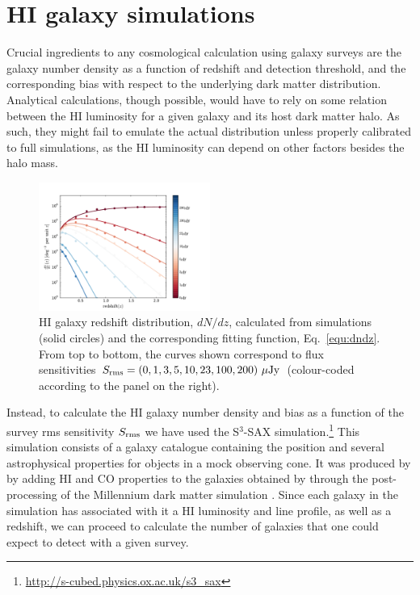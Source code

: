 \documentclass[useAMS,usenatbib]{mn2e}
\begin{document}
\section{HI galaxy simulations}

Crucial ingredients to any cosmological calculation using galaxy surveys are the galaxy number density as a function of redshift and detection threshold, and the corresponding bias with respect to the underlying dark matter distribution. Analytical calculations, though possible, would have to rely on some relation between the HI luminosity for a given galaxy and its host dark matter halo. As such, they might fail to emulate the actual distribution unless properly calibrated to full simulations, as the HI luminosity can depend on other factors besides the halo mass.
\begin{figure}
\begin{center}
\includegraphics[width=0.5\textwidth]{plots/fittingMario_dNOverdz_using_ObreschkowFunc.pdf}
\caption{HI galaxy redshift distribution, $dN/dz$, calculated from simulations (solid circles) and the corresponding fitting function, Eq.~\eqref{equ:dndz}. From top to bottom, the curves shown correspond to flux sensitivities $S_{\rm{rms}} = (0, 1, 3, 5, 10, 23, 100, 200) \ \mu{\rm Jy} $ (colour-coded according to the panel on the right).}
\label{fig:dNOverdz_fit_sax3}
\end{center}\vspace{-3em}
\end{figure}

Instead, to calculate the HI galaxy number density and bias as a function of the survey rms sensitivity $S_{\rm{rms}}$ we have used the S$^3$-SAX simulation.\footnote{\url{http://s-cubed.physics.ox.ac.uk/s3_sax}}
This simulation consists of a galaxy catalogue containing the position and
several astrophysical properties for objects in a mock observing cone. It was
produced by \citet{2009ApJ...703.1890O} by adding HI and CO properties to the galaxies
obtained by \citet{2007MNRAS.375....2D} through the post-processing of the Millennium
dark matter simulation \citep{2005Natur.435..629S}. Since each galaxy in the simulation has associated with it a HI luminosity and line profile, as well as a redshift, we can proceed to calculate the number of galaxies that one could expect to detect with a given survey.
\end{document}
